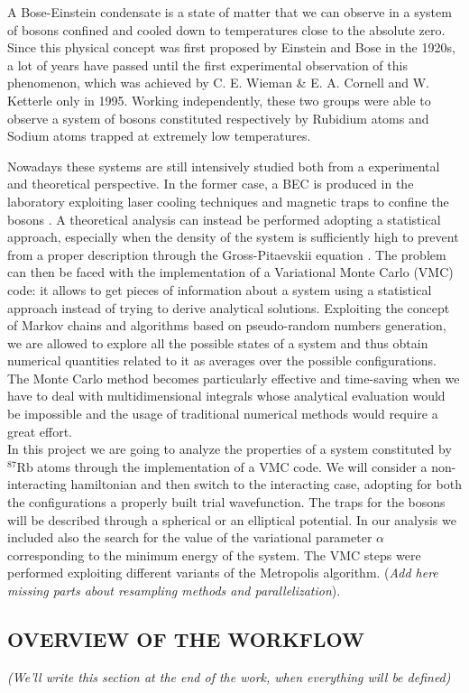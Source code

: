 A Bose-Einstein condensate is a state of matter that we can observe in a system of bosons confined and cooled down to temperatures close to the absolute zero. Since this physical concept was first proposed by Einstein and Bose \cite{einstein_original} in the 1920s, a lot of years have passed until the first experimental observation of this phenomenon, which was achieved by C. E. Wieman \& E. A. Cornell \cite{wieman} and W. Ketterle \cite{ketterle} only in 1995. Working independently, these two groups were able to observe a system of bosons constituted respectively by Rubidium atoms and Sodium atoms trapped at extremely low temperatures. 

Nowadays these systems are still intensively studied both from a experimental and theoretical perspective. In the former case, a BEC is produced in the laboratory exploiting laser cooling techniques and magnetic traps to confine the bosons \cite{lasercooling}. A theoretical analysis can instead be performed adopting a statistical approach, especially when the density of the system is sufficiently high to prevent from a proper description through the Gross-Pitaevskii equation \cite{gross}\cite{pita}. The problem can then be faced with the implementation of a Variational Monte Carlo (VMC) code: it allows to get pieces of information about a system using a statistical approach instead of trying to derive analytical solutions. Exploiting the concept of Markov chains \cite{markov} and algorithms based on pseudo-random numbers generation, we are allowed to explore all the possible states of a system and thus obtain numerical quantities related to it as averages over the possible configurations. The Monte Carlo method becomes particularly effective and time-saving when we have to deal with multidimensional integrals whose analytical evaluation would be impossible and the usage of traditional numerical methods would require a great effort. \\


In this project we are going to analyze the properties of a system constituted by $^{87}$Rb atoms through the implementation of a VMC code. We will consider a non-interacting hamiltonian and then switch to the interacting case, adopting for both the configurations a properly built trial wavefunction. The traps for the bosons will be described through a spherical or an elliptical potential. In our analysis we included also the search for the value of the variational parameter $\alpha$ corresponding to the minimum energy of the system. The VMC steps were performed exploiting different variants of the Metropolis algorithm. \cite{metropolis} \cite{hastings} (\textit{Add here missing parts about resampling methods and parallelization}).


\subsection{OVERVIEW OF THE WORKFLOW}
\textit{(We'll write this section at the end of the work, when everything will be defined)}